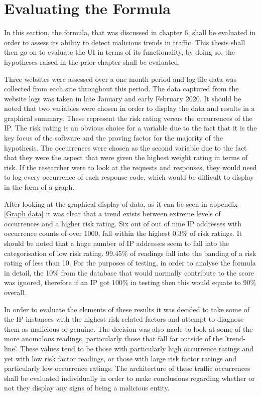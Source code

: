 \section{Evaluating the Formula}
In this section, the formula, that was discussed in chapter 6, shall be evaluated in order to assess its ability to detect malicious trends in traffic. This thesis shall then go on to evaluate the UI in terms of its functionality, by doing so, the hypotheses raised in the prior chapter shall be evaluated.

Three websites were assessed over a one month period and log file data was collected from each site throughout this period. The data captured from the website logs was taken in late January and early February 2020. It should be noted that two variables were chosen in order to display the data and results in a graphical summary. These represent the risk rating versus the occurrences of the IP. The risk rating is an obvious choice for a variable due to the fact that it is the key focus of the software and the proving factor for the majority of the hypothesis. The occurrences were chosen as the second variable due to the fact that they were the aspect that were given the highest weight rating in terms of risk. If the researcher were to look at the requests and responses, they would need to log every occurrence of each response code, which would be difficult to display in the form of a graph.



After looking at the graphical display of data, as it can be seen in appendix 
\ref{Graph data} it was clear that a trend exists between extreme levels of occurrences and a higher risk rating. Six out of out of nine IP addresses with occurrence counts of over 1000, fall within the highest 0.3\% of risk ratings. It should be noted that a huge number of IP addresses seem to fall into the categorisation of low risk rating. 99.45\% of readings fall into the banding of a risk rating of less than 10. For the purposes of testing, in order to analyse the formula in detail, the 10\% from the database that would normally contribute to the score was ignored, therefore if an IP got 100\% in testing then this would equate to 90\% overall.

In order to evaluate the elements of these results it was decided to take some of the IP instances with the highest risk related factors and attempt to diagnose them as malicious or genuine. The decision was also made to look at some of the more anomalous readings, particularly those that fall far outside of the 'trend-line'. These values tend to be those with particularly high occurrence ratings and yet with low risk factor readings, or those with large risk factor ratings and particularly low occurrence ratings. The architecture of these traffic occurrences shall be evaluated individually in order to make conclusions regarding whether or not they display any signs of being a malicious entity.

